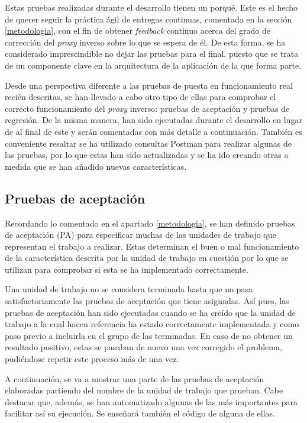 \documentclass[11pt,spanish,listoffigures]{tfgetsinf}
\begin{document}
Estas pruebas realizadas durante el desarrollo tienen un porqué. Este es el hecho de querer seguir la práctica ágil de entregas continuas, comentada en la sección \ref{metodologia}, con el fin de obtener \emph{feedback} continuo acerca del grado de corrección del \emph{proxy} inverso sobre lo que se espera de él. De esta forma, se ha considerado imprescindible no dejar las pruebas para el final, puesto que se trata de un componente clave en la arquitectura de la aplicación de la que forma parte.

Desde una perspectiva diferente a las pruebas de puesta en funcionamiento real recién descritas, se han llevado a cabo otro tipo de ellas para comprobar el correcto funcionamiento del \emph{proxy} inverso: pruebas de aceptación y pruebas de regresión. De la misma manera, han sido ejecutadas durante el desarrollo en lugar de al final de este y serán comentadas con más detalle a continuación. También es conveniente resaltar se ha utilizado consultas Postman para realizar algunas de las pruebas, por lo que estas han sido actualizadas y se ha ido creando otras a medida que se han añadido nuevas características.


		\subsection{Pruebas de aceptación} \label{pruebasDeAceptacion}

Recordando lo comentado en el apartado \ref{metodologia}, se han definido pruebas de aceptación (PA) para especificar muchas de las unidades de trabajo que representan el trabajo a realizar. Estas determinan el buen o mal funcionamiento de la característica descrita por la unidad de trabajo en cuestión por lo que se utilizan para comprobar si esta se ha implementado correctamente.

Una unidad de trabajo no se considera terminada hasta que no pasa satisfactoriamente las pruebas de aceptación que tiene asignadas. Así pues, las pruebas de aceptación han sido ejecutadas cuando se ha creído que la unidad de trabajo a la cual hacen referencia ha estado correctamente implementada y como paso previo a incluirla en el grupo de las terminadas. En caso de no obtener un resultado positivo, estas se pasaban de nuevo una vez corregido el problema, pudiéndose repetir este proceso más de una vez.

A continuación, se va a mostrar una parte de las pruebas de aceptación elaboradas partiendo del nombre de la unidad de trabajo que prueban. Cabe destacar que, además, se han automatizado algunas de las más importantes para facilitar así su ejecución. Se enseñará también el código de alguna de ellas.
\end{document}
